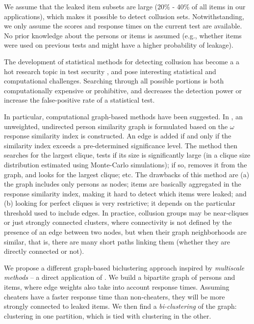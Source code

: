 \documentclass{article}
\begin{document}
We assume that the leaked item subsets are large (20\% - 40\% of all items in our applications), which makes it possible to detect collusion sets. Notwithstanding, we only assume the scores and response times on the current test are available. No prior knowledge about the persons or items is assumed (e.g., whether items were used on previous tests and might have a higher probability of leakage).

The development of statistical methods for detecting collusion has become a a hot research topic in test security \cite{refs}, and pose interesting statistical and computational challenges. Searching through all possible portions is both computationally expensive or prohibitive, and decreases the detection power or increase the false-positive rate of a statistical test.

In particular, computational graph-based methods have been suggested. In \cite{belov}, an unweighted, undirected person similarity graph is formulated based on the $\omega$ response similarity index is constructed. An edge is added if and only if the similarity index exceeds a pre-determined significance level. The method then searches for the largest clique, tests if its size is significantly large (in a clique size distribution estimated using Monte-Carlo simulations); if so, removes it from the graph, and looks for the largest clique; etc. The drawbacks of this method are (a) the graph includes only persons as nodes; items are basically aggregated in the response similarity index, making it hard to detect which items were leaked; and (b) looking for perfect cliques is very restrictive; it depends on the particular threshold used to include edges. In practice, collusion groups may be near-cliques or just strongly connected clusters, where connectivity is not defined by the presence of an edge between two nodes, but when their graph neighborhoods are similar, that is, there are many short paths linking them (whether they are directly connected or not).

We propose a different graph-based biclustering approach inspired by {\it multiscale methods} -- a direct application of \cite[Sec.~10]{msgd}. We build a bipartite graph of persons and items, where edge weights also take into account response times. Assuming cheaters have a faster response time than non-cheaters, they will be more strongly connected to leaked items. We then find a {\it bi-clustering} of the graph: clustering in one partition, which is tied with clustering in the other.
\end{document}
